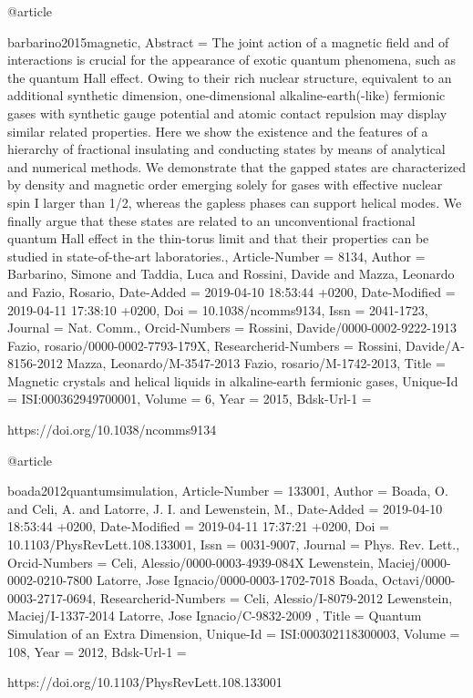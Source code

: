 \documentclass[epj,final]{svjour}
\begin{document}
{@article{barbarino2015magnetic,
	Abstract = {{The joint action of a magnetic field and of interactions is crucial for
   the appearance of exotic quantum phenomena, such as the quantum Hall
   effect. Owing to their rich nuclear structure, equivalent to an
   additional synthetic dimension, one-dimensional alkaline-earth(-like)
   fermionic gases with synthetic gauge potential and atomic contact
   repulsion may display similar related properties. Here we show the
   existence and the features of a hierarchy of fractional insulating and
   conducting states by means of analytical and numerical methods. We
   demonstrate that the gapped states are characterized by density and
   magnetic order emerging solely for gases with effective nuclear spin I
   larger than 1/2, whereas the gapless phases can support helical modes.
   We finally argue that these states are related to an unconventional
   fractional quantum Hall effect in the thin-torus limit and that their
   properties can be studied in state-of-the-art laboratories.}},
	Article-Number = {{8134}},
	Author = {Barbarino, Simone and Taddia, Luca and Rossini, Davide and Mazza, Leonardo and Fazio, Rosario},
	Date-Added = {2019-04-10 18:53:44 +0200},
	Date-Modified = {2019-04-11 17:38:10 +0200},
	Doi = {{10.1038/ncomms9134}},
	Issn = {{2041-1723}},
	Journal = {Nat. Comm.},
	Orcid-Numbers = {{Rossini, Davide/0000-0002-9222-1913 Fazio, rosario/0000-0002-7793-179X}},
	Researcherid-Numbers = {{Rossini, Davide/A-8156-2012 Mazza, Leonardo/M-3547-2013 Fazio, rosario/M-1742-2013}},
	Title = {{Magnetic crystals and helical liquids in alkaline-earth fermionic gases}},
	Unique-Id = {{ISI:000362949700001}},
	Volume = {{6}},
	Year = {{2015}},
	Bdsk-Url-1 = {https://doi.org/10.1038/ncomms9134

@article{boada2012quantumsimulation,
	Article-Number = {{133001}},
	Author = {Boada, O. and Celi, A. and Latorre, J. I. and Lewenstein, M.},
	Date-Added = {2019-04-10 18:53:44 +0200},
	Date-Modified = {2019-04-11 17:37:21 +0200},
	Doi = {{10.1103/PhysRevLett.108.133001}},
	Issn = {{0031-9007}},
	Journal = {Phys. Rev. Lett.},
	Orcid-Numbers = {{Celi, Alessio/0000-0003-4939-084X Lewenstein, Maciej/0000-0002-0210-7800 Latorre, Jose Ignacio/0000-0003-1702-7018 Boada, Octavi/0000-0003-2717-0694}},
	Researcherid-Numbers = {{Celi, Alessio/I-8079-2012 Lewenstein, Maciej/I-1337-2014 Latorre, Jose Ignacio/C-9832-2009 }},
	Title = {{Quantum Simulation of an Extra Dimension}},
	Unique-Id = {{ISI:000302118300003}},
	Volume = {{108}},
	Year = {{2012}},
	Bdsk-Url-1 = {https://doi.org/10.1103/PhysRevLett.108.133001

}}}}}
\end{document}

